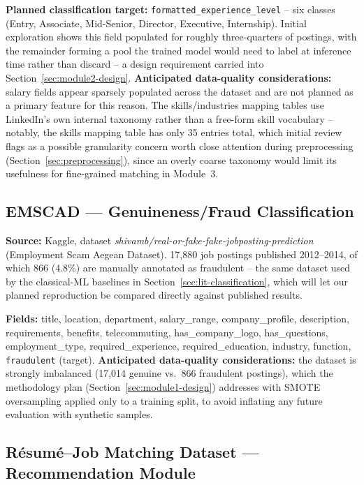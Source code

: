 \documentclass[11pt,a4paper]{article}
\begin{document}
\textbf{Planned classification target:} \texttt{formatted\_experience\_level} -- six
classes (Entry, Associate, Mid-Senior, Director, Executive, Internship). Initial
exploration shows this field populated for roughly three-quarters of postings, with the
remainder forming a pool the trained model would need to label at inference time rather
than discard -- a design requirement carried into Section~\ref{sec:module2-design}.
\textbf{Anticipated data-quality considerations:} salary fields appear sparsely
populated across the dataset and are not planned as a primary feature for this reason.
The skills/industries mapping tables use LinkedIn's own internal taxonomy rather than a
free-form skill vocabulary -- notably, the skills mapping table has only 35 entries
total, which initial review flags as a possible granularity concern worth close
attention during preprocessing (Section~\ref{sec:preprocessing}), since an overly coarse
taxonomy would limit its usefulness for fine-grained matching in Module~3.

\subsection{EMSCAD --- Genuineness/Fraud Classification}
\label{sec:dataset-emscad}

\textbf{Source:} Kaggle, dataset \textit{shivamb/real-or-fake-fake-jobposting-prediction}
(Employment Scam Aegean Dataset). 17{,}880 job postings published 2012--2014, of which
866 (4.8\%) are manually annotated as fraudulent -- the same dataset used by the
classical-ML baselines in Section~\ref{sec:lit-classification}, which will let our
planned reproduction be compared directly against published results.

\textbf{Fields:} title, location, department, salary\_range, company\_profile,
description, requirements, benefits, telecommuting, has\_company\_logo, has\_questions,
employment\_type, required\_experience, required\_education, industry, function,
\texttt{fraudulent} (target). \textbf{Anticipated data-quality considerations:} the
dataset is strongly imbalanced (17{,}014 genuine vs.\ 866 fraudulent postings), which the
methodology plan (Section~\ref{sec:module1-design}) addresses with SMOTE oversampling
applied only to a training split, to avoid inflating any future evaluation with
synthetic samples.

\subsection{R\'esum\'e--Job Matching Dataset --- Recommendation Module}
\label{sec:dataset-resume}
\end{document}
